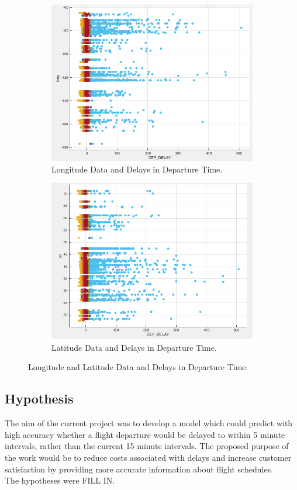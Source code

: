 \documentclass[a4paper, 10pt]{article}
\begin{document}
\begin{figure}[H]
\centering
\begin{subfigure}{.5\textwidth}
  \centering
  \includegraphics[width=.7\linewidth]{long}
  \caption{Longitude Data and Delays in Departure Time.}
\end{subfigure}%
\begin{subfigure}{.5\textwidth}
  \centering
  \includegraphics[width=.7\linewidth]{lat}
  \caption{Latitude Data and Delays in Departure Time.}
\end{subfigure}
\caption{Longitude and Latitude Data and Delays in Departure Time.}
\end{figure}



\subsection{Hypothesis}\label{hypothesis}
The aim of the current project was to develop a model which could predict with high accuracy whether a flight departure would be delayed to within 5 minute intervals, rather than the current 15 minute intervals. The proposed purpose of the work would be to reduce costs associated with delays and increase customer satisfaction by providing more accurate information about flight schedules. \\
The hypotheses were FILL IN.
\end{document}
